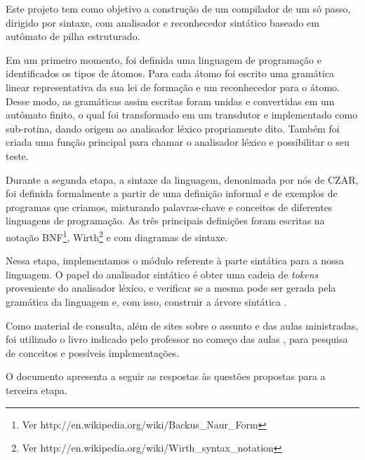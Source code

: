 
Este projeto tem como objetivo a construção de um compilador de um só passo, dirigido por sintaxe, com analisador e reconhecedor sintático baseado em autômato de pilha estruturado.

Em um primeiro momento, foi definida uma linguagem de programação e identificados os tipos de átomos. Para cada átomo foi escrito uma gramática linear representativa da sua lei de formação e um reconhecedor para o átomo. Desse modo, as gramáticas assim escritas foram unidas e convertidas em um autômato finito, o qual foi transformado em um transdutor e implementado como sub-rotina, dando origem ao analisador léxico propriamente dito. Também foi criada uma função principal para chamar o analisador léxico e possibilitar o seu teste.

Durante a segunda etapa, a sintaxe da linguagem, denonimada por nós de CZAR, foi definida formalmente a partir de uma definição informal e de exemplos de programas que criamos, misturando palavras-chave e conceitos de diferentes linguagens de programação. As três principais definições foram escritas na notação BNF\footnote{Ver http://en.wikipedia.org/wiki/Backus\_Naur\_Form}, Wirth\footnote{Ver http://en.wikipedia.org/wiki/Wirth\_syntax\_notation} e com diagramas de sintaxe.

Nessa etapa, implementamos o módulo referente à parte sintática para a nossa linguagem. O papel do analisador sintático é obter uma cadeia de \emph{tokens} proveniente do analisador léxico, e verificar se a mesma pode ser gerada pela gramática da linguagem e, com isso, construir a árvore sintática \cite{alfred1986compilers}.

Como material de consulta, além de sites sobre o assunto e das aulas ministradas, foi utilizado o livro indicado pelo professor no começo das aulas \cite{intro-compiladores}, para pesquisa de conceitos e possíveis implementações.

O documento apresenta a seguir as respostas às questões propostas para a terceira etapa.
